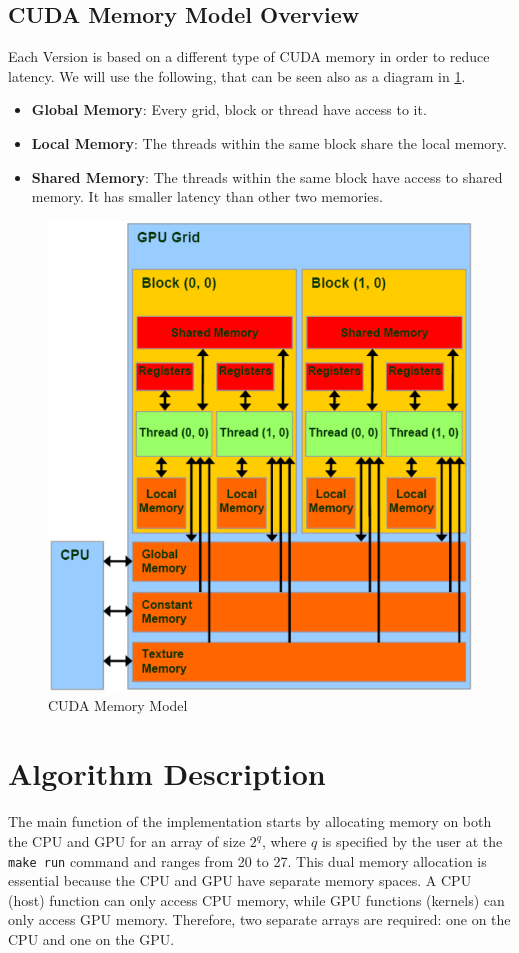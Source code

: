 \documentclass[a4paper,12pt]{article}
\begin{document}
\subsection{CUDA Memory Model Overview}
Each Version is based on a different type of CUDA memory in order to reduce latency. We will use the following, that can be seen also as a diagram in \ref{fig:CUDA}.

\begin{itemize}
    \item \textbf{Global Memory}: Every grid, block or thread have access to it.
    \item \textbf{Local Memory}: The threads within the same block share the local memory.
    \item \textbf{Shared Memory}: The threads within the same block have access to shared memory. It has smaller latency than other two memories.

    
\end{itemize}


\begin{figure}[H]
    \centering
    \includegraphics[width=0.5\linewidth]{assets/CUDA Memory Model.png}
    \caption{CUDA Memory Model}
    \label{fig:CUDA}
\end{figure}






\section{Algorithm Description}

The main function of the implementation starts by allocating memory on both the CPU and GPU for an array of size \(2^q\), where \(q\) is specified by the user at the \texttt{make run} command and ranges from 20 to 27. This dual memory allocation is essential because the CPU and GPU have separate memory spaces. A CPU (host) function can only access CPU memory, while GPU functions (kernels) can only access GPU memory. Therefore, two separate arrays are required: one on the CPU and one on the GPU. 
\end{document}
